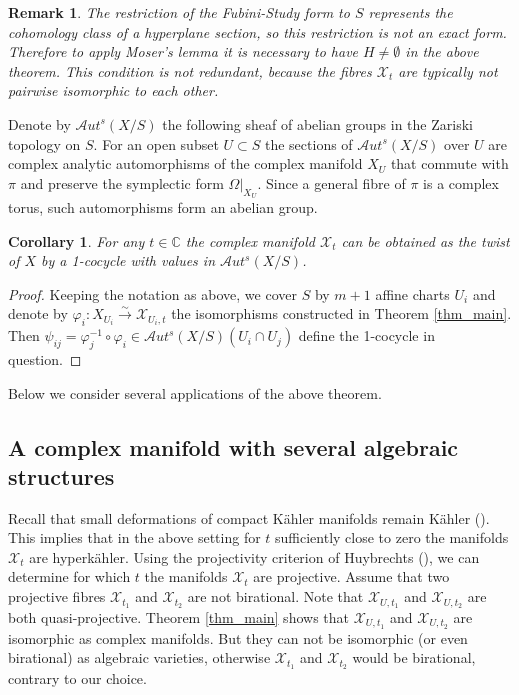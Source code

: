 \documentclass[10pt]{amsart}
\newcommand{\bbC}{\mathbb{C}}
\newcommand{\XX}{\mathcal{X}}
\newtheorem{cor}[defn]{Corollary}
\newtheorem{rem}[defn]{Remark}
\begin{document}
\begin{rem}
The restriction of the Fubini-Study form to $S$ represents the cohomology
class of a hyperplane section, so this restriction is not an exact form.
Therefore to apply Moser's lemma it is necessary
to have $H\neq \emptyset$ in the above theorem. This condition is not
redundant, because the fibres $\XX_t$ are typically not pairwise isomorphic
to each other.
\end{rem}

Denote by $\mathcal{A}ut^s(X/S)$ the following sheaf of abelian groups in the Zariski topology
on $S$. For an open subset $U\subset S$ the sections of $\mathcal{A}ut^s(X/S)$ over $U$ are
complex analytic automorphisms of the complex manifold $X_U$ that commute with $\pi$
and preserve the symplectic form $\Omega|_{X_U}$.
Since a general fibre of $\pi$ is a complex torus, such automorphisms form an abelian group.

\begin{cor}\label{cor_twist}
For any $t\in \bbC$ the complex manifold $\XX_{t}$ can be obtained
as the twist of $X$ by a 1-cocycle with values in $\mathcal{A}ut^s(X/S)$.
\end{cor}
\begin{proof}
Keeping the notation as above, we cover $S$ by $m+1$ affine charts $U_i$
and denote by $\varphi_i\colon X_{U_i}\stackrel{\sim}{\to} \XX_{U_i,t}$ the
isomorphisms constructed in Theorem \ref{thm_main}. Then
$\psi_{ij} = \varphi_j^{-1}\circ\varphi_i \in \mathcal{A}ut^s(X/S)(U_i\cap U_j)$
define the 1-cocycle in question.
\end{proof}

Below we consider several applications of the above theorem.

\subsection{A complex manifold with several algebraic structures}
\label{_several_algebraic_Subsection_}
Recall that small deformations of compact K\"ahler manifolds remain K\"ahler
(\cite{_Kod-Spen-AnnMath-1960_}).
This implies that in the above setting for $t$ sufficiently close to zero the manifolds
$\XX_t$ are hyperk\"ahler. Using the projectivity criterion of Huybrechts
(\cite[Proposition 26.13]{Hu1}),
we can determine for which $t$ the manifolds $\XX_t$ are projective.
Assume that two projective fibres $\XX_{t_1}$ and $\XX_{t_2}$
are not birational.
Note that $\XX_{U,t_1}$ and $\XX_{U,t_2}$ are both quasi-projective.
Theorem \ref{thm_main} shows that $\XX_{U,t_1}$ and $\XX_{U,t_2}$ are isomorphic
as complex manifolds. But they can not be isomorphic (or even birational) as algebraic varieties,
otherwise $\XX_{t_1}$ and $\XX_{t_2}$ would be birational, contrary to our choice.
\end{document}
